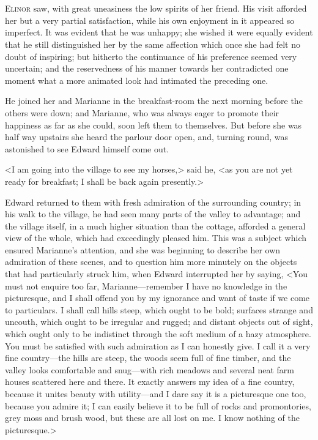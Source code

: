 \chapter[Chapter \thechapter]{}
\lettrine[lraise=0.3]{E}{linor} saw, with great uneasiness the low spirits of her friend. His visit afforded her but a very partial satisfaction, while his own enjoyment in it appeared so imperfect. It was evident that he was unhappy; she wished it were equally evident that he still distinguished her by the same affection which once she had felt no doubt of inspiring; but hitherto the continuance of his preference seemed very uncertain; and the reservedness of his manner towards her contradicted one moment what a more animated look had intimated the preceding one.

He joined her and Marianne in the breakfast-room the next morning before the others were down; and Marianne, who was always eager to promote their happiness as far as she could, soon left them to themselves. But before she was half way upstairs she heard the parlour door open, and, turning round, was astonished to see Edward himself come out.

<I am going into the village to see my horses,> said he, <as you are not yet ready for breakfast; I shall be back again presently.>

Edward returned to them with fresh admiration of the surrounding country; in his walk to the village, he had seen many parts of the valley to advantage; and the village itself, in a much higher situation than the cottage, afforded a general view of the whole, which had exceedingly pleased him. This was a subject which ensured Marianne's attention, and she was beginning to describe her own admiration of these scenes, and to question him more minutely on the objects that had particularly struck him, when Edward interrupted her by saying, <You must not enquire too far, Marianne—remember I have no knowledge in the picturesque, and I shall offend you by my ignorance and want of taste if we come to particulars. I shall call hills steep, which ought to be bold; surfaces strange and uncouth, which ought to be irregular and rugged; and distant objects out of sight, which ought only to be indistinct through the soft medium of a hazy atmosphere. You must be satisfied with such admiration as I can honestly give. I call it a very fine country—the hills are steep, the woods seem full of fine timber, and the valley looks comfortable and snug—with rich meadows and several neat farm houses scattered here and there. It exactly answers my idea of a fine country, because it unites beauty with utility—and I dare say it is a picturesque one too, because you admire it; I can easily believe it to be full of rocks and promontories, grey moss and brush wood, but these are all lost on me. I know nothing of the picturesque.>

